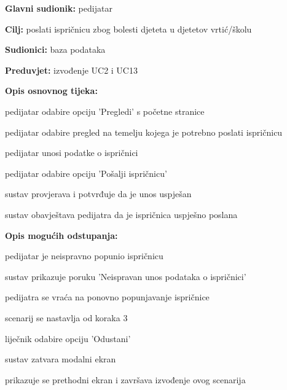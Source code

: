                     \noindent {}
					\begin{packed_item}
	
						\item \textbf{Glavni sudionik: }pedijatar
						\item  \textbf{Cilj:} poslati ispričnicu zbog bolesti djeteta u djetetov vrtić/školu
						\item  \textbf{Sudionici:} baza podataka
						\item  \textbf{Preduvjet:} izvođenje UC2 i UC13
						\item  \textbf{Opis osnovnog tijeka:}
						
						\item[] \begin{packed_enum}
	
							\item pedijatar odabire opciju 'Pregledi' s početne stranice
							\item pedijatar odabire pregled na temelju kojega je potrebno poslati ispričnicu
							\item pedijatar unosi podatke o ispričnici
                            \item pedijatar odabire opciju 'Pošalji ispričnicu'
                            \item sustav provjerava i potvrđuje da je unos uspješan
                            \item sustav obavještava pedijatra da je ispričnica uspješno poslana

						\end{packed_enum}
						
						\item  \textbf{Opis mogućih odstupanja:}
						
						\item[] \begin{packed_item}
	
                            \item[5.a] pedijatar je neispravno popunio ispričnicu
							\item[] \begin{packed_enum}
								\item sustav prikazuje poruku 'Neispravan unos podataka o ispričnici'
								\item pedijatra se vraća na ponovno popunjavanje ispričnice
								\item scenarij se nastavlja od koraka 3
							\end{packed_enum}

							\item[5.b] liječnik odabire opciju 'Odustani'
							\item [] \begin{packed_enum}
								\item sustav zatvara modalni ekran
								\item prikazuje se prethodni ekran i završava izvođenje ovog scenarija
							\end{packed_enum}
							
						\end{packed_item}
					\end{packed_item}

